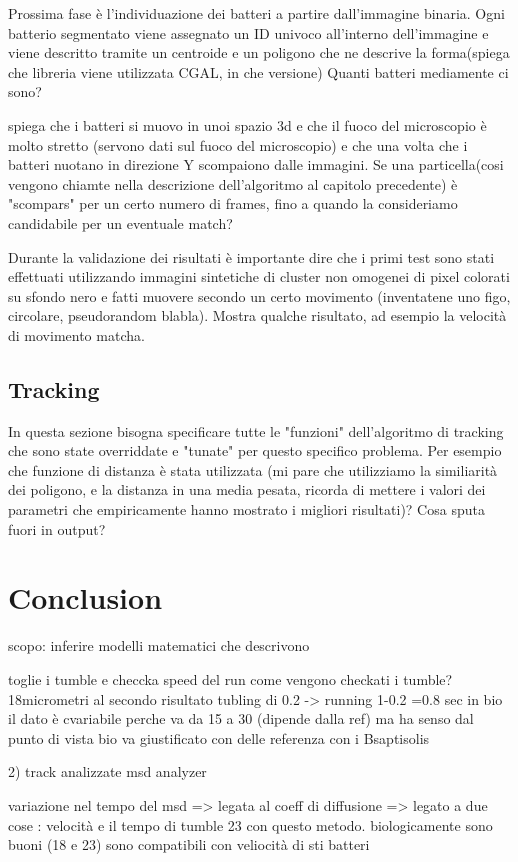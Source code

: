 \documentclass[conference]{IEEEtran}
\begin{document}
Prossima fase è l'individuazione dei batteri a partire dall'immagine binaria. Ogni batterio segmentato viene assegnato un ID univoco all'interno dell'immagine e viene descritto tramite un centroide e un poligono che ne descrive la forma(spiega che libreria viene utilizzata CGAL, in che versione)
Quanti batteri mediamente ci sono? 


spiega che i batteri si muovo in unoi spazio 3d e che il fuoco del microscopio è molto stretto (servono dati sul fuoco del microscopio) e che una volta che i batteri nuotano in direzione Y scompaiono dalle immagini. 
Se una particella(cosi vengono chiamte nella descrizione dell'algoritmo al capitolo precedente) è "scompars" per un certo numero di frames, fino a quando la consideriamo candidabile per un eventuale match?

Durante la validazione dei risultati è importante dire che i primi test sono stati effettuati utilizzando immagini  sintetiche di cluster non omogenei di pixel colorati su sfondo nero e fatti muovere secondo un certo movimento  (inventatene uno figo, circolare, pseudorandom blabla). 
Mostra qualche risultato, ad esempio la velocità di movimento matcha. 
\subsection{Tracking}
In questa sezione bisogna specificare tutte le "funzioni" dell'algoritmo di tracking che sono state overriddate e "tunate" per questo specifico problema. Per esempio che funzione di distanza è stata utilizzata (mi pare che utilizziamo la similiarità dei poligono, e la distanza in una media pesata, ricorda di mettere i valori dei parametri che empiricamente hanno mostrato i migliori risultati)?
Cosa sputa fuori in output?  

\section{Conclusion}
scopo: inferire modelli matematici che descrivono 

toglie i tumble e checcka speed del run
come vengono checkati i tumble?
18micrometri al secondo risultato
tubling di 0.2 -> running 1-0.2 =0.8 sec
in bio il dato è cvariabile perche va da 15 a 30 (dipende dalla ref) ma ha senso dal punto di vista bio
va giustificato con delle referenza con i Bsaptisolis

2) track analizzate msd analyzer

variazione nel tempo del msd => legata al coeff di diffusione
 => legato a due cose : velocità e il tempo di tumble
 23 con questo metodo. biologicamente sono buoni (18 e 23) sono compatibili con veliocità di sti batteri
 
\end{document}
